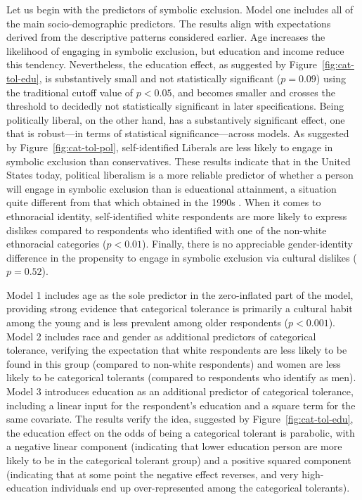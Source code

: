 \documentclass[12pt]{article}
\begin{document}
Let us begin with the predictors of symbolic exclusion. Model one includes all of the main socio-demographic predictors. The results align with expectations derived from the descriptive patterns considered earlier. Age increases the likelihood of engaging in symbolic exclusion, but education and income reduce this tendency. Nevertheless, the education effect, as suggested by Figure~\ref{fig:cat-tol-edu}, is substantively small and not statistically significant ($p = 0.09$) using the traditional cutoff value of $p < 0.05$, and becomes smaller and crosses the threshold to decidedly not statistically significant in later specifications. Being politically liberal, on the other hand, has a substantively significant effect, one that is robust---in terms of statistical significance---across models. As suggested by Figure~\ref{fig:cat-tol-pol}, self-identified Liberals are less likely to engage in symbolic exclusion than conservatives. These results indicate that in the United States today, political liberalism is a more reliable predictor of whether a person will engage in symbolic exclusion than is educational attainment, a situation quite different from that which obtained in the 1990s \citep{bryson1996anything-311}. When it comes to ethnoracial identity, self-identified white respondents are more likely to express dislikes compared to respondents who identified with one of the non-white ethnoracial categories ($p < 0.01$). Finally, there is no appreciable gender-identity difference in the propensity to engage in symbolic exclusion via cultural dislikes ($p = 0.52$).

Model 1 includes age as the sole predictor in the zero-inflated part of the model, providing strong evidence that categorical tolerance is primarily a cultural habit among the young and is less prevalent among older respondents ($p < 0.001$). Model 2 includes race and gender as additional predictors of categorical tolerance, verifying the expectation that white respondents are less likely to be found in this group (compared to non-white respondents) and women are less likely to be categorical tolerants (compared to respondents who identify as men). Model 3 introduces education as an additional predictor of categorical tolerance, including a linear input for the respondent's education and a square term for the same covariate. The results verify the idea, suggested by Figure~\ref{fig:cat-tol-edu}, the education effect on the odds of being a categorical tolerant is parabolic, with a negative linear component (indicating that lower education person are more likely to be in the categorical tolerant group) and a positive squared component (indicating that at some point the negative effect reverses, and very high-education individuals end up over-represented among the categorical tolerants). 
\end{document}
